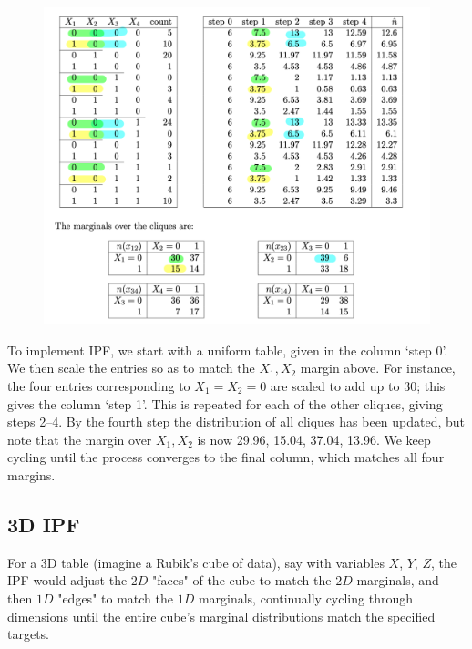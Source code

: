 \documentclass{article}
\begin{document}
\begin{figure}
    \centering
    \includegraphics[width=0.8\linewidth]{overviews/graphical-models/figures/IPF_Tables.png}
\end{figure}

To implement IPF, we start with a uniform table, given in the column `step 0'. We then scale the entries so as to match the \(X_1, X_2\) margin above. For instance, the four entries corresponding to \(X_1 = X_2 = 0\) are scaled to add up to 30; this gives the column `step 1'. This is repeated for each of the other cliques, giving steps 2--4. By the fourth step the distribution of all cliques has been updated, but note that the margin over \(X_1, X_2\) is now 29.96, 15.04, 37.04, 13.96. We keep cycling until the process converges to the final column, which matches all four margins.


\subsection{3D IPF}

For a 3D table (imagine a Rubik's cube of data), say with variables \(X\), \(Y\), \(Z\), the IPF would adjust the \(2D\) "faces" of the cube to match the \(2D\) marginals, and then \(1D\) "edges" to match the \(1D\) marginals, continually cycling through dimensions until the entire cube's marginal distributions match the specified targets.
\end{document}
